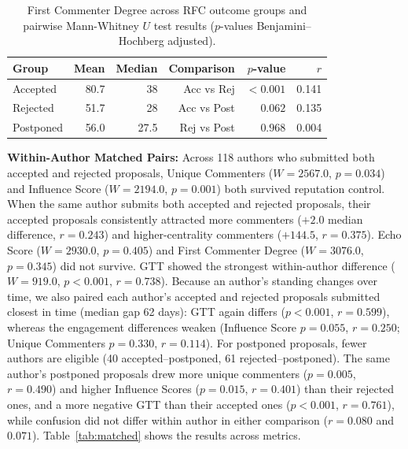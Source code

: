 \documentclass[conference]{IEEEtran}
\begin{document}
\vspace{-10pt}
\begin{table}[h]
\centering
\caption{First Commenter Degree across RFC outcome groups and pairwise Mann-Whitney $U$ test results ($p$-values Benjamini--Hochberg adjusted).}
\label{tab:fcd}
\begin{tabular}{lrrrrr}
\toprule
\textbf{Group}
  & \textbf{Mean}
  & \textbf{Median}
  & \textbf{Comparison}
  & \textbf{$p$-value}
  & \textbf{$r$} \\
\midrule
Accepted  & 80.7 & 38
  & Acc vs Rej & ${<}0.001$ & 0.141 \\
Rejected  & 51.7 & 28
  & Acc vs Post & $0.062$ & 0.135 \\
Postponed & 56.0 & 27.5
  & Rej vs Post & $0.968$ & 0.004 \\
\bottomrule
\end{tabular}
\end{table}

\textbf{Within-Author Matched Pairs:}
\label{sec:matched_pairs}
Across 118 authors who submitted both accepted and rejected proposals, Unique Commenters ($W = 2567.0$, $p = 0.034$) and Influence Score ($W = 2194.0$, $p = 0.001$) both survived reputation control. When the same author submits both accepted and rejected proposals, their accepted proposals consistently attracted more commenters ($+2.0$ median difference, $r = 0.243$) and higher-centrality commenters ($+144.5$, $r = 0.375$). Echo Score ($W = 2930.0$, $p = 0.405$) and First Commenter Degree ($W = 3076.0$, $p = 0.345$) did not survive. GTT showed the strongest within-author difference ($W = 919.0$, $p {<} 0.001$, $r = 0.738$). Because an author's standing changes over time, we also paired each author's accepted and rejected proposals submitted closest in time (median gap 62 days): GTT again differs ($p {<} 0.001$, $r = 0.599$), whereas the engagement differences weaken (Influence Score $p = 0.055$, $r = 0.250$; Unique Commenters $p = 0.330$, $r = 0.114$). For postponed proposals, fewer authors are eligible (40 accepted--postponed, 61 rejected--postponed). The same author's postponed proposals drew more unique commenters ($p = 0.005$, $r = 0.490$) and higher Influence Scores ($p = 0.015$, $r = 0.401$) than their rejected ones, and a more negative GTT than their accepted ones ($p {<} 0.001$, $r = 0.761$), while confusion did not differ within author in either comparison ($r = 0.080$ and $0.071$). Table~\ref{tab:matched} shows the results across metrics.
\end{document}
